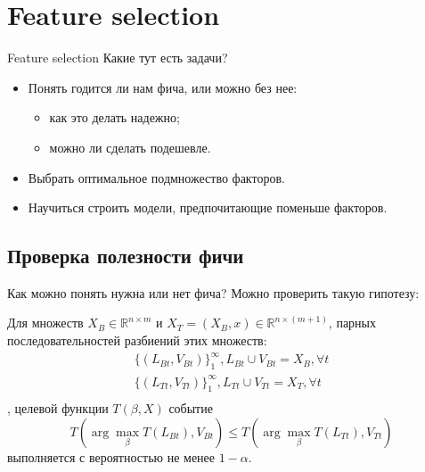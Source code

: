 \documentclass[14pt, fleqn, xcolor={dvipsnames, table}]{beamer}
\begin{document}
\section{Feature selection}
\begin{frame}{Feature selection}
Какие тут есть задачи?
\begin{itemize}
  \item Понять годится ли нам фича, или можно без нее:
  \begin{itemize}
    \item как это делать надежно;
    \item можно ли сделать подешевле.
  \end{itemize}
  \item Выбрать оптимальное подмножество факторов.
  \item Научиться строить модели, предпочитающие поменьше факторов.
\end{itemize}
\end{frame}

\subsection{Проверка полезности фичи}
\begin{frame}{Как можно понять нужна или нет фича?}
Можно проверить такую гипотезу:
\begin{theorem}{}{} \small Для множеств $X_B \in \mathbb{R}^{n\times m}$ и $X_T = (X_B, x) \in \mathbb{R}^{n\times (m+1)}$, парных последовательностей разбиений этих множеств:
$$\begin{array}{l}
\{(L_{Bt}, V_{Bt})\}_1^{\infty}, L_{Bt} \cup V_{Bt} = X_B, \forall t\\
\{(L_{Tt}, V_{Tt})\}_1^{\infty}, L_{Tt} \cup V_{Tt} = X_T, \forall t\\
\end{array}$$
, целевой функции $T(\beta, X)$ событие
$$
T(\arg \max_{\beta} T(L_{Bt}), V_{Bt}) \le T(\arg \max_{\beta} T(L_{Tt}), V_{Tt})
$$
выполняется с вероятностью не менее $1 - \alpha$.
\end{theorem}
\end{frame}
\end{document}
